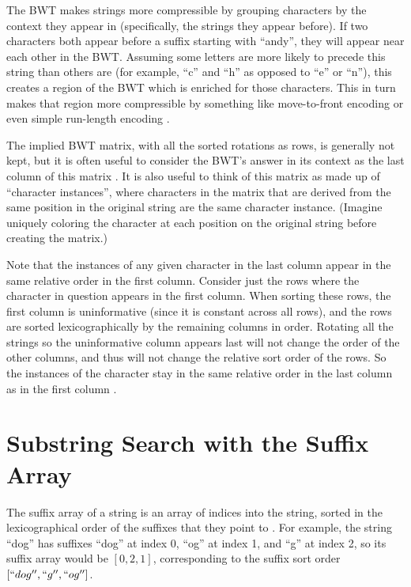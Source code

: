 \documentclass[11pt,proposal]{ucthesis}
\begin{document}
The BWT makes strings more compressible by grouping characters by the context they appear in (specifically, the strings they appear before). If two characters both appear before a suffix starting with ``andy'', they will appear near each other in the BWT. Assuming some letters are more likely to precede this string than others are (for example, ``c'' and ``h'' as opposed to ``e'' or ``n''), this creates a region of the BWT which is enriched for those characters. This in turn makes that region more compressible by something like move-to-front encoding or even simple run-length encoding \cite{burrows1994block}.

The implied BWT matrix, with all the sorted rotations as rows, is generally not kept, but it is often useful to consider the BWT's answer in its context as the last column of this matrix \cite{burrows1994block, ferragina2000opportunistic}. It is also useful to think of this matrix as made up of ``character instances'', where characters in the matrix that are derived from the same position in the original string are the same character instance. (Imagine uniquely coloring the character at each position on the original string before creating the matrix.)

Note that the instances of any given character in the last column appear in the same relative order in the first column. Consider just the rows where the character in question appears in the first column. When sorting these rows, the first column is uninformative (since it is constant across all rows), and the rows are sorted lexicographically by the remaining columns in order. Rotating all the strings so the uninformative column appears last will not change the order of the other columns, and thus will not change the relative sort order of the rows. So the instances of the character stay in the same relative order in the last column as in the first column \cite{langmead2013introduction}.


    
    
    
    
\section{Substring Search with the Suffix Array}

The suffix array of a string is an array of indices into the string, sorted in the lexicographical order of the suffixes that they point to \cite{manber1993suffix}. For example, the string ``dog'' has suffixes ``dog'' at index 0, ``og'' at index 1, and ``g'' at index 2, so its suffix array would be $[0, 2, 1]$, corresponding to the suffix sort order $[``dog'', ``g'', ``og'']$.
\end{document}
